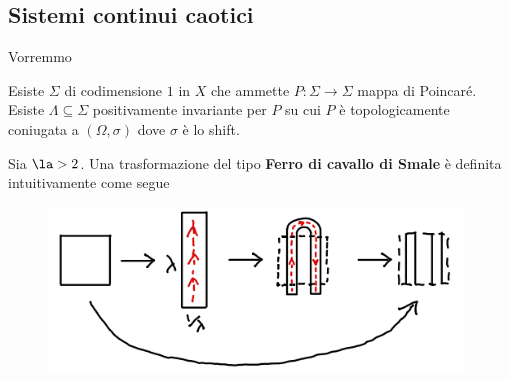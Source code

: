 \subsection{Sistemi continui caotici}
Vorremmo
\begin{theorem}
Esiste $\Sigma$ di codimensione $1$ in $X$ che ammette $P:\Sigma\to\Sigma$ mappa di Poincar\'e.\\
Esiste $\Lambda\subseteq \Sigma$ positivamente invariante per $P$ su cui $P$ \`e topologicamente coniugata a $(\Omega,\sigma)$ dove $\sigma$ \`e lo shift.
\end{theorem}

\begin{definition}
Sia $\la>2$. Una trasformazione del tipo \textbf{Ferro di cavallo di Smale} \`e definita intuitivamente come segue
\begin{figure}[!htb]
    \centering
    \includegraphics[width=11cm]{Immagini/Ferro_di_cavallo_di_Smale.png}
\end{figure}
\end{definition}